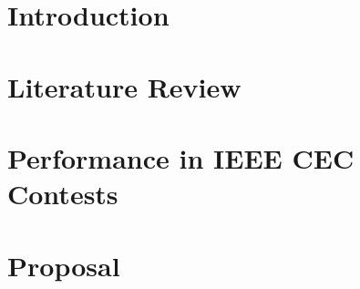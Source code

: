 


\section{Introduction}
\label{sec:Introduction}


\section{Literature Review}
\label{sec:Literature}


\section{Performance in IEEE CEC Contests}
\label{sec:trends}


\section{Proposal}
\label{sec:Proposal}


